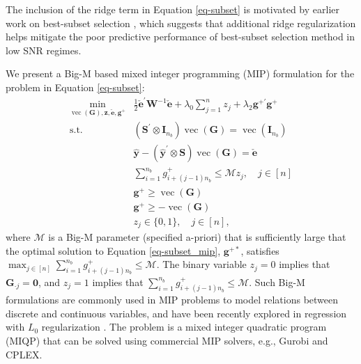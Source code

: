 \documentclass[
  11pt]{article}
\theoremstyle{plain}
\theoremstyle{remark}
\begin{document}
The inclusion of the ridge term in Equation \eqref{eq-subset} is
motivated by earlier work on best-subset selection
\citep[e.g.,][]{Hazimeh2020-xd, Mazumder2022-hx}, which suggests that
additional ridge regularization helps mitigate the poor predictive
performance of best-subset selection method in low SNR regimes.

We present a Big-M based mixed integer programming (MIP) formulation for
the problem in Equation \eqref{eq-subset}:
\begin{align} \label{eq-subset_mip}
\min_{\operatorname{vec}(\bm{G}), \bm{z}, \check{\bm{e}}, \bm{g}^{+}} & \frac{1}{2}\check{\bm{e}}^{\prime} \bm{W}^{-1}\check{\bm{e}} + \lambda_0 \sum_{j=1}^n z_j + \lambda_2 \bm{g}^{+\prime}\bm{g}^{+} \\
\text{s.t.} \quad & \left(\bm{S}^{\prime} \otimes \bm{I}_{n_b}\right) \operatorname{vec}(\bm{G})=\operatorname{vec}\left(\bm{I}_{n_b}\right)\nonumber \\
& \hat{\bm{y}}-\left(\hat{\bm{y}}^{\prime} \otimes \bm{S}\right)\operatorname{vec}(\bm{G}) = \check{\bm{e}} \nonumber\\
& \sum_{i=1}^{n_b} g_{i + (j-1) n_b}^{+} \leqslant \mathcal{M} z_j, \quad j \in[n] \nonumber\\
& \bm{g}^{+} \geqslant \operatorname{vec}(\bm{G}) \nonumber\\
& \bm{g}^{+} \geqslant-\operatorname{vec}(\bm{G}) \nonumber\\
& z_j \in\{0,1\}, \quad j \in[n], \nonumber
\end{align} where \(\mathcal{M}\) is a Big-M parameter (specified
a-priori) that is sufficiently large that the optimal solution to
Equation \eqref{eq-subset_mip}, \(\bm{g}^{+*}\), satisfies
\(\max_{j \in [n]}\sum_{i=1}^{n_b} g_{i + (j-1) n_b}^{+} \leqslant \mathcal{M}\).
The binary variable \(z_j=0\) implies that \(\bm{G}_{\cdot j}=\bm{0}\),
and \(z_j=1\) implies that
\(\sum_{i=1}^{n_b} g_{i + (j-1) n_b}^{+} \leqslant \mathcal{M}\). Such
Big-M formulations are commonly used in MIP problems to model relations
between discrete and continuous variables, and have been recently
explored in regression with \(L_0\) regularization
\citep{Bertsimas2016-ig}. The problem is a mixed integer quadratic
program (MIQP) that can be solved using commercial MIP solvers, e.g.,
Gurobi and CPLEX.
\end{document}
